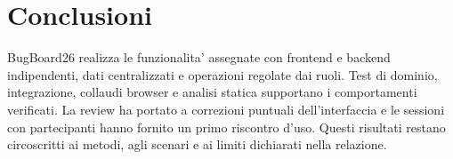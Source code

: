 \documentclass[11pt,a4paper,oneside]{report}
\begin{document}
\section{Conclusioni}
BugBoard26 realizza le funzionalita' assegnate con frontend e backend
indipendenti, dati centralizzati e operazioni regolate dai ruoli.
Test di dominio, integrazione, collaudi browser e analisi statica
supportano i comportamenti verificati. La review ha portato a correzioni
puntuali dell'interfaccia e le sessioni con partecipanti hanno fornito un
primo riscontro d'uso. Questi risultati restano circoscritti ai metodi,
agli scenari e ai limiti dichiarati nella relazione.
\end{document}
